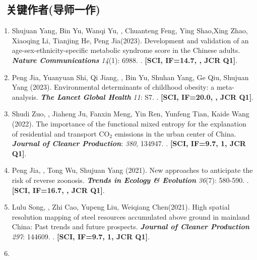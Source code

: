 \subsection*{\texorpdfstring{\faBook\ 关键作者(导师一作)}{关键作者(导师一作)}}
\begin{enumerate}
\item
    Shujuan Yang, Bin Yu, Wanqi Yu, \Shaoqing, Chuanteng Feng, Ying Shao,Xing Zhao, Xiaoqing Li, Tianjing He, Peng Jia\CS (2023).
    Development and validation of an age-sex-ethnicity-specific metabolic syndrome score in the Chinese adults.
    \textbf{\textit{Nature Communications}} \textit{14}(1): 6988.
    . \textbf{[SCI, IF=14.7, , JCR Q1]}.
\item
    Peng Jia\CS, Yuanyuan Shi, Qi Jiang, \Shaoqing, Bin Yu, Shuhan Yang, Ge Qiu, Shujuan Yang (2023).
    Environmental determinants of childhood obesity: a meta-analysis.
    \textbf{\textit{The Lancet Global Health}} \textit{11}: S7.
    . 
    \textbf{[SCI, IF=20.0, , JCR Q1]}.
\item
    Shudi Zuo\CS, \Shaoqing, Jiaheng Ju, Fanxin Meng, Yin Ren, Yunfeng Tian, Kaide Wang (2022).
    The importance of the functional mixed entropy for the explanation of residential and transport CO$_2$ emissions in the urban center of China.
    \textbf{\textit{Journal of Cleaner Production}}: \textit{380}, 134947.
    . \textbf{[SCI, IF=9.7, 1, JCR Q1]}.
\item
    Peng Jia\CS, \Shaoqing, Tong Wu, Shujuan Yang (2021).
    New approaches to anticipate the risk of reverse zoonosis.
    \textbf{\textit{Trends in Ecology \& Evolution}} \textit{36}(7): 580-590.
    . 
    \textbf{[SCI, IF=16.7, , JCR Q1]}.
\item
    Lulu Song, \Shaoqing, Zhi Cao, Yupeng Liu, Weiqiang Chen\CS (2021).
    High spatial resolution mapping of steel resources accumulated above ground in mainland China: Past trends and future prospects.
    \textbf{\textit{Journal of Cleaner Production}} \textit{297}: 144609.
    . 
    \textbf{[SCI, IF=9.7, 1, JCR Q1]}.
\item

\end{enumerate}
